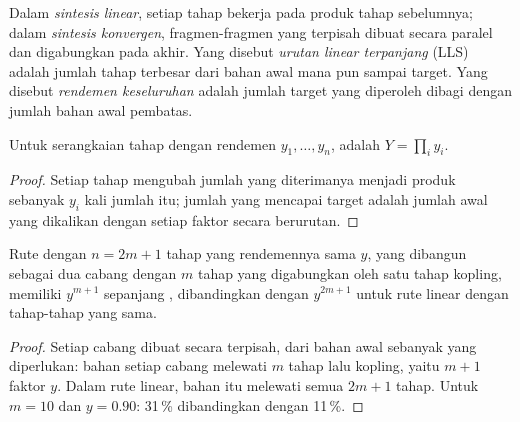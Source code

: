 \begin{definition}\label{def:b3:total-synthesis:architecture}
Dalam \emph{sintesis linear}, setiap tahap bekerja pada
produk tahap sebelumnya; dalam \emph{sintesis konvergen},
fragmen-fragmen yang terpisah dibuat secara paralel dan digabungkan pada akhir. Yang disebut
\emph{urutan linear terpanjang} (LLS) adalah
jumlah tahap terbesar dari bahan awal mana pun sampai target. Yang disebut
\emph{rendemen keseluruhan} adalah jumlah target yang diperoleh
dibagi dengan jumlah bahan awal pembatas.
\end{definition}

\begin{proposition}\label{prop:b3:total-synthesis:overall-yield}
Untuk serangkaian tahap dengan rendemen $y_1, \dots, y_n$,  adalah $Y = \prod_i y_i$.
\end{proposition}

\begin{proof}
Setiap tahap mengubah jumlah yang diterimanya menjadi produk sebanyak $y_i$ kali jumlah itu; jumlah
yang mencapai target adalah jumlah awal yang dikalikan dengan setiap faktor secara
berurutan.
\end{proof}

\begin{proposition}[Konvergensi]\label{prop:b3:total-synthesis:convergent}
Rute dengan $n = 2m + 1$ tahap yang rendemennya sama $y$, yang dibangun sebagai dua cabang dengan $m$ tahap yang digabungkan oleh
satu tahap kopling, memiliki  $y^{m+1}$ sepanjang ,
dibandingkan dengan $y^{2m+1}$ untuk rute linear dengan tahap-tahap yang sama.
\end{proposition}

\begin{proof}
Setiap cabang dibuat secara terpisah, dari bahan awal sebanyak yang diperlukan:
bahan setiap cabang melewati $m$ tahap lalu kopling, yaitu $m + 1$
faktor $y$. Dalam rute linear, bahan itu melewati semua $2m + 1$ tahap. Untuk $m = 10$
dan $y = 0.90$: 31\,\% dibandingkan dengan 11\,\%.
\end{proof}

